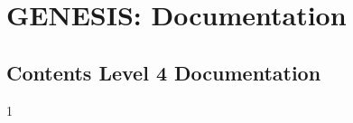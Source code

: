 \documentclass[12pt]{article}
\begin{document}
\section*{GENESIS: Documentation}

\subsection*{Contents Level 4 Documentation}

\begin{itemize}

1
\end{itemize}

\end{document}
